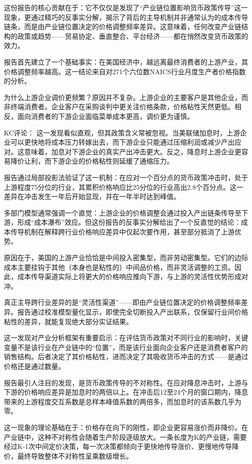 \documentclass[11pt]{ctexart}
\begin{document}
这份报告的核心贡献在于：它不仅仅是发现了“产业链位置影响货币政策传导”这一现象，更通过精巧的反事实分解，揭示了背后的主导机制并非通常认为的成本传导链条，而是由产业链位置决定的价格调整频率差异。这意味着，任何改变产业链结构的政策或趋势——贸易协定、垂直整合、平台经济——都在悄然改变货币政策的效力。

报告首先建立了一个基础事实：在美国经济中，越远离最终消费者的上游产业，其价格调整频率越高。这一结论来自对271个六位数NAICS行业月度生产者价格指数的分析。

为什么上游企业调价更频繁？原因并不复杂。上游企业的主要客户是其他企业，而非终端消费者。企业客户在采购谈判中更关注价格条款，价格粘性天然更低。相反，面向消费者的下游企业面临菜单成本更高，调价更为谨慎。

KC评论： 这一发现看似直观，但其政策含义常被忽视。当美联储加息时，上游企业可以更快地将成本压力转嫁出去，而下游企业只能通过压缩利润或减少产出应对。这意味着，加息对下游企业的真实产出冲击更大。反之，降息时上游企业更容易降价让利，而下游企业的价格粘性则延缓了通缩压力。

报告通过局部投影法验证了这一机制：在应对一个百分点的货币政策冲击时，处于上游程度75分位的行业，其累积价格响应比25分位的行业高出2.8个百分点。这一差异在冲击发生一年后开始显现，并在一年半时达到峰值。

多部门模型通常强调一个直觉：上游企业的价格调整会通过投入产出链条传导至下游，形成“成本瀑布”效应。但这份报告的反事实分解给出了一个反直觉的结论：成本传导机制在解释跨行业价格响应差异中仅起次要作用，甚至部分抵消了上游优势。

原因在于，美国的上游产业恰恰是中间投入密集型，而非劳动密集型。它们的边际成本主要挂钩于其他（本身也是粘性的）中间品价格，而非灵活调整的工资。因此，成本传导渠道实际上将更大的价格响应推向下游，与上游的灵活性优势形成对冲。

真正主导跨行业差异的是“灵活性渠道”——即由产业链位置决定的价格调整频率差异。报告通过校准模型量化显示，即使完全切断投入产出联系，仅保留行业间价格粘性的差异，就能复现绝大部分实证结果。

这一发现对产业分析框架有重要启示：在评估货币政策对不同行业的影响时，关键变量不是该行业在产业链中的“位置”，而是该行业面向企业客户还是消费者客户的销售结构。后者决定了其价格粘性，进而决定了其吸收货币冲击的方式——是通过价格还是通过数量。

报告最引人注目的发现，是货币政策传导的不对称性。在应对降息冲击时，上游与下游的价格响应差异是加息时的两倍以上。在冲击后12至24个月的窗口期内，降息带来的上游程度交互系数是总样本峰值系数的两倍多，而加息时的该系数几乎为零。

这一现象的理论基础在于：价格存在向下的刚性，即企业更容易涨价而非降价。在产业链中，这种不对称性会随着生产阶段逐级放大。一条长度为K的产业链，需要经过K-1次中间定价决策，每一次决策都倾向于更快地传导涨价、更慢地传导降价，最终导致整体不对称性呈乘数级增长。
\end{document}

